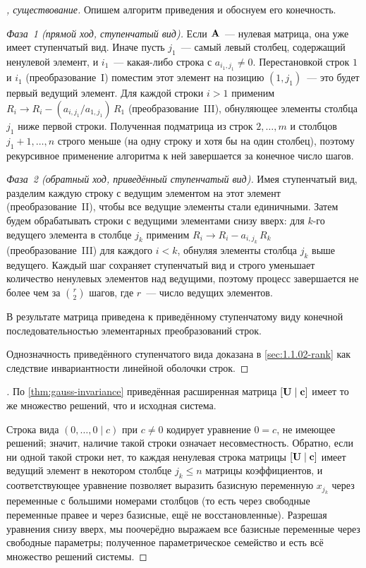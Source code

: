 \begin{proof}[, существование]
Опишем алгоритм приведения и обоснуем его конечность.

\emph{Фаза~1 (прямой ход, ступенчатый вид).} Если $\mathbf{A}$~--- нулевая
матрица, она уже имеет ступенчатый вид. Иначе пусть $j_1$~--- самый
левый столбец, содержащий ненулевой элемент, и $i_1$~--- какая-либо
строка с $a_{i_1, j_1} \neq 0$. Перестановкой строк $1$ и $i_1$
(преобразование~I) поместим этот элемент на позицию $(1, j_1)$~---
это будет первый ведущий элемент. Для каждой строки $i > 1$ применим
$R_i \to R_i - (a_{i, j_1}/a_{1, j_1})\,R_1$ (преобразование~III),
обнуляющее элементы столбца $j_1$ ниже первой строки. Полученная
подматрица из строк $2, \dots, m$ и столбцов $j_1 + 1, \dots, n$
строго меньше (на одну строку и хотя бы на один столбец), поэтому
рекурсивное применение алгоритма к ней завершается за конечное число
шагов.

\emph{Фаза~2 (обратный ход, приведённый ступенчатый вид).} Имея
ступенчатый вид, разделим каждую строку с ведущим элементом на этот
элемент (преобразование~II), чтобы все ведущие элементы стали
единичными. Затем будем обрабатывать строки с ведущими элементами
снизу вверх: для $k$-го ведущего элемента в столбце $j_k$ применим
$R_i \to R_i - a_{i, j_k}\,R_k$ (преобразование~III) для каждого
$i < k$, обнуляя элементы столбца $j_k$ выше ведущего. Каждый шаг
сохраняет ступенчатый вид и строго уменьшает количество ненулевых
элементов над ведущими, поэтому процесс завершается не более чем за
$\binom{r}{2}$ шагов, где $r$~--- число ведущих элементов.

В результате матрица приведена к приведённому ступенчатому виду
конечной последовательностью элементарных преобразований строк.

Однозначность приведённого ступенчатого вида доказана в
\cref{sec:1.1.02-rank} как следствие инвариантности линейной оболочки
строк.
\end{proof}

\begin{proof}[]
По \cref{thm:gauss-invariance} приведённая расширенная матрица
$[\mathbf{U} \mid \mathbf{c}]$ имеет то же множество решений, что и
исходная система.

Строка вида $(0, \dots, 0 \mid c)$ при $c \neq 0$ кодирует уравнение
$0 = c$, не имеющее решений; значит, наличие такой строки означает
несовместность. Обратно, если ни одной такой строки нет, то каждая
ненулевая строка матрицы $[\mathbf{U} \mid \mathbf{c}]$ имеет ведущий
элемент в некотором столбце $j_k \le n$ матрицы коэффициентов, и
соответствующее уравнение позволяет выразить базисную переменную
$x_{j_k}$ через переменные с большими номерами столбцов (то есть
через свободные переменные правее и через базисные, ещё не
восстановленные). Разрешая уравнения снизу вверх, мы поочерёдно
выражаем все базисные переменные через свободные параметры; полученное
параметрическое семейство и есть всё множество решений системы.
\end{proof}

